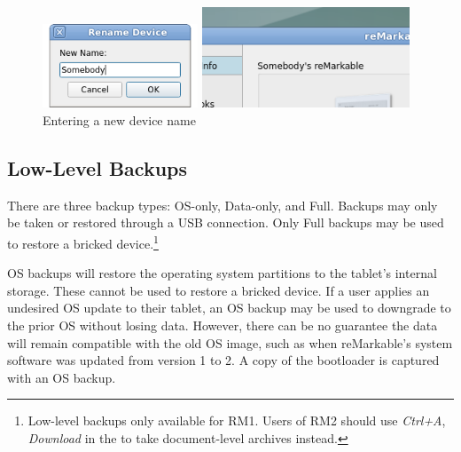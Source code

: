 \documentclass{memoir}
\begin{document}
{%


\begin{figure}[h]
\centering
\begin{minipage}{.5\textwidth}
  \centering
  \includegraphics[height=2.5cm]{images/rename-dialog.png}
\end{minipage}%
\begin{minipage}{.5\textwidth}
  \centering
  \includegraphics[height=3cm]{images/rename-label.png}
\end{minipage}
\caption{Entering a new device name}
\end{figure}


\subsection{Low-Level Backups}
There are three backup types: OS-only, Data-only, and Full. Backups may only be taken or restored through a USB connection. Only Full backups may be used to restore a bricked device.\footnote{Low-level backups only available for RM1. Users of RM2 should use \textit{Ctrl+A}, \textit{Download} in the  to take document-level archives instead.}

OS backups will restore the operating system partitions to the tablet's internal storage. These cannot be used to restore a bricked device. If a user applies an undesired OS update to their tablet, an OS backup may be used to downgrade to the prior OS without losing data. However, there can be no guarantee the data will remain compatible with the old OS image, such as when reMarkable's system software was updated from version 1 to 2. A copy of the bootloader is captured with an OS backup.

}
\end{document}
